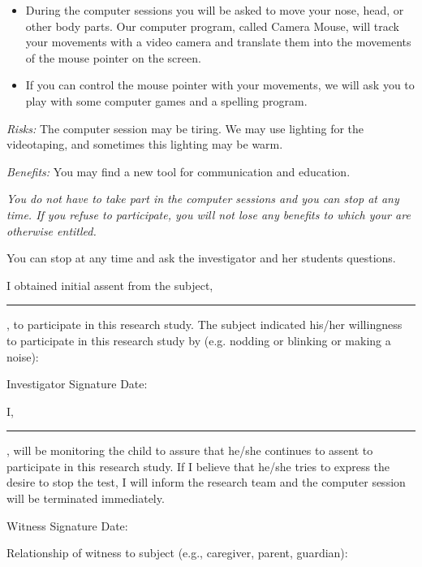 \begin{letter}
\begin{center}
{{\begin{itemize}
\item During the computer sessions you will be asked to move your
nose, head, or other body parts.  Our computer program, called Camera
Mouse, will track your movements with a video camera and translate
them into the movements of the mouse pointer on the screen.

\item If you can control the mouse pointer with your movements, we
will ask you to play with some computer games and a spelling program.

\end{itemize}

{\em Risks:}  The computer session may be tiring.  We may use lighting for the
videotaping, and sometimes this lighting may be warm.

{\em Benefits:} You may find a new tool for communication and
education.

\vspace*{.3cm}

{\em You do not have to take part in the computer sessions and you can
stop at any time.  If you refuse to participate, you will not lose any
benefits to which your are otherwise entitled. }

\vspace*{.3cm}

You can stop at any time and ask the investigator and her
students questions.

}}
\end{center}


\vspace*{.3cm}

I obtained initial assent from the subject, \rule{4cm}{.01cm}, to participate
in this research study.  The subject indicated his/her willingness to
participate in this research study by (e.g.  nodding or blinking or
making a noise):

\vspace{1cm}

Investigator Signature \hrulefill    Date: \hrulefill


\vspace{.5cm}

I, \rule{4cm}{.01cm}, will be monitoring the child to assure that he/she
continues to assent to participate in this research study.  If I
believe that he/she tries to express the desire to stop the test, I
will inform the research team and the computer session will be
terminated immediately.

\vspace{0.5cm}

Witness Signature \hrulefill  Date: \hrulefill

\vspace{0.2cm}

Relationship of witness to subject (e.g., caregiver, parent,
guardian):  \hrulefill

\end{letter}

 